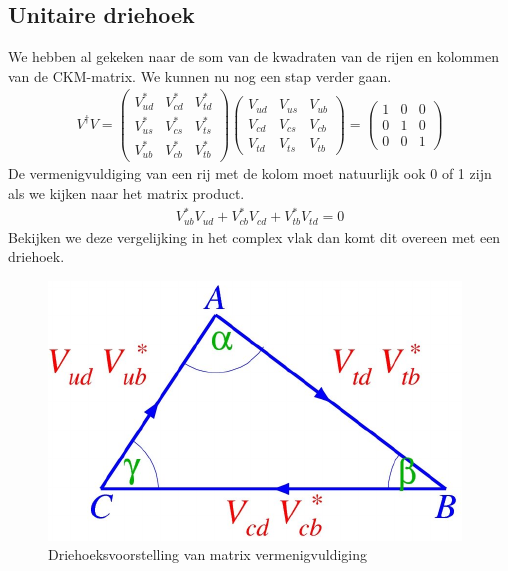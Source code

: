 \documentclass[../main.tex]{subfiles}
\begin{document}
\subsection{Unitaire driehoek}%
\label{sub:unitaire_driehoek}

We hebben al gekeken naar de som van de kwadraten van de rijen en kolommen van de CKM-matrix. We kunnen nu nog een stap verder gaan.
\begin{equation}
    \begin{aligned}
        \label{eq:unitaire_driehoek}
        V^{\dagger} V=\left(\begin{array}{ccc}
                V_{u d}^{*} & V_{c d}^{*} & V_{t d}^{*} \\
                V_{u s}^{*} & V_{c s}^{*} & V_{t s}^{*} \\
                V_{u b}^{*} & V_{c b}^{*} & V_{t b}^{*}
                \end{array}\right)\left(\begin{array}{ccc}
                V_{u d} & V_{u s} & V_{u b} \\
                V_{c d} & V_{c s} & V_{c b} \\
                V_{t d} & V_{t s} & V_{t b}
                \end{array}\right)=\left(\begin{array}{ccc}
                1 & 0 & 0 \\
                0 & 1 & 0 \\
                0 & 0 & 1
        \end{array}\right)
    \end{aligned}
\end{equation}
De vermenigvuldiging van een rij met de kolom moet natuurlijk ook 0 of 1 zijn als we kijken naar het matrix product.
\begin{equation}
    \begin{aligned}
        \label{eq:matrix_vermenigvuldiging}
        V_{u b}^{*} V_{u d}+V_{c b}^{*} V_{c d}+V_{t b}^{*} V_{t d}=0
    \end{aligned}
\end{equation}
Bekijken we deze vergelijking in het complex vlak dan komt dit overeen met een driehoek.

\begin{figure}[h]
    \centering
    \includegraphics[width=0.6\linewidth]{cp_violation/complexe_driehoek.png}
    \caption{Driehoeksvoorstelling van matrix vermenigvuldiging}%
    \label{fig:cp_violation/complexe_driehoek}
\end{figure}
\end{document}
